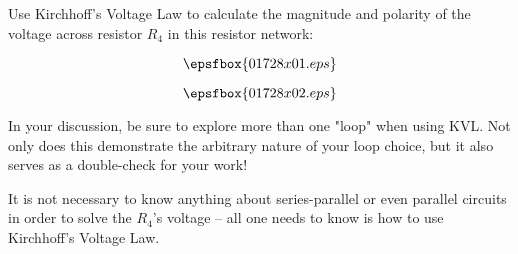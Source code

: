 

Use Kirchhoff's Voltage Law to calculate the magnitude and polarity of the voltage across resistor $R_4$ in this resistor network:

$$\epsfbox{01728x01.eps}$$







$$\epsfbox{01728x02.eps}$$







In your discussion, be sure to explore more than one "loop" when using KVL.  Not only does this demonstrate the arbitrary nature of your loop choice, but it also serves as a double-check for your work!

It is not necessary to know anything about series-parallel or even parallel circuits in order to solve the $R_4$'s voltage -- all one needs to know is how to use Kirchhoff's Voltage Law.




